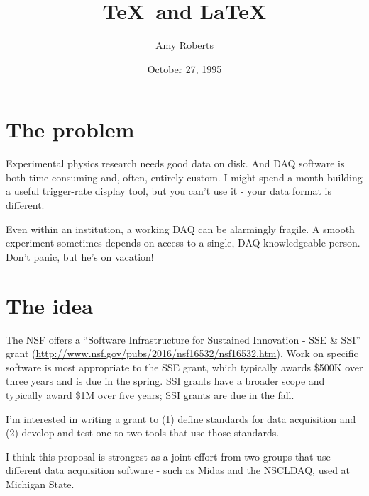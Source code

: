 \documentclass[]{report}   %
\begin{document}
\title{\TeX\ and \LaTeX}   %
\author{Amy Roberts}         %
\date{October 27, 1995}    %


\section*{The problem}     %

Experimental physics research needs good data on disk.  And DAQ software is both time consuming and, often, entirely custom.  I might spend a month building a useful trigger-rate display tool, but you can't use it - your data format is different.  

Even within an institution, a working DAQ can be alarmingly fragile.  A smooth experiment sometimes depends on access to a single, DAQ-knowledgeable person.  Don't panic, but he's on vacation!  


\section*{The idea}     %
The NSF offers a ``Software Infrastructure for Sustained Innovation - SSE \& SSI'' grant
(\url{http://www.nsf.gov/pubs/2016/nsf16532/nsf16532.htm}).  Work on specific software is most appropriate to the SSE grant, which typically awards \$500K over three years and is due in the spring.  SSI grants have a broader scope and typically award \$1M over five years; SSI grants are due in the fall.

I'm interested in writing a grant to (1) define standards for data acquisition and (2) develop and test one to two tools that use those standards.  

I think this proposal is strongest as a joint effort from two groups that use different data acquisition software - such as Midas and the NSCLDAQ, used at Michigan State.
\end{document}
